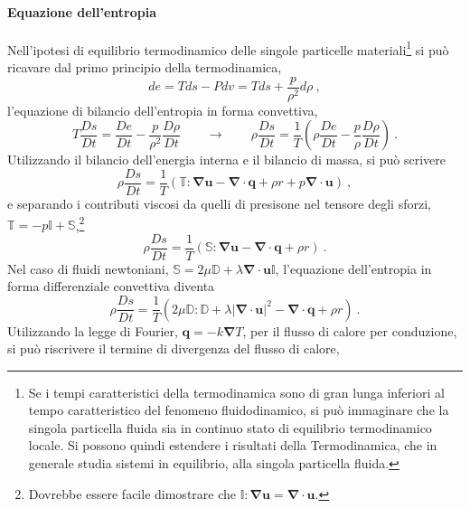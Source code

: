 \paragraph{Equazione dell'entropia} Nell'ipotesi di equilibrio termodinamico delle singole particelle materiali\footnote{Se i tempi caratteristici della termodinamica sono di gran lunga inferiori al tempo caratteristico del fenomeno fluidodinamico, si può immaginare che la singola particella fluida sia in continuo stato di equilibrio termodinamico locale. Si possono quindi estendere i risultati della Termodinamica, che in generale studia sistemi in equilibrio, alla singola particella fluida.} si può ricavare dal primo principio della termodinamica,
\begin{equation}
 de = T ds - P dv = T ds + \dfrac{p}{\rho^2} d\rho \ ,
\end{equation}
l'equazione di bilancio dell'entropia in forma convettiva,
\begin{equation}
 T \dfrac{D s}{D t} = \dfrac{D e}{D t} - \dfrac{p}{\rho^2} \dfrac{D \rho}{D t} \qquad \rightarrow \qquad
 \rho \dfrac{D s}{D t} = \dfrac{1}{T} \left( \rho \dfrac{D e}{D t} -  \dfrac{p}{\rho} \dfrac{D \rho}{D t} \right) \ . 
\end{equation}
Utilizzando il bilancio dell'energia interna e il bilancio di massa, si può scrivere
\begin{equation}
 \rho \dfrac{D s}{D t} = \dfrac{1}{T} \left( \mathbb{T} : \bm{\nabla} \bm{u} - \bm{\nabla} \cdot \bm{q} + \rho r + p \bm{\nabla} \cdot \bm{u} \right) \ ,
\end{equation}
e separando i contributi viscosi da quelli di presisone nel tensore degli sforzi, $\mathbb{T} = - p \mathbb{I} + \mathbb{S}$,\footnote{Dovrebbe essere facile dimostrare che $\mathbb{I}:\bm{\nabla}\bm{u} = \bm{\nabla} \cdot \bm{u}$.}
\begin{equation}
 \rho \dfrac{D s}{D t} = \dfrac{1}{T} \left( \mathbb{S} : \bm{\nabla} \bm{u} - \bm{\nabla} \cdot \bm{q} + \rho r \right) \ .
\end{equation}
Nel caso di fluidi newtoniani, $\mathbb{S} = 2\mu\mathbb{D} + \lambda\bm{\nabla} \cdot \bm{u} \mathbb{I}$, l'equazione dell'entropia in forma differenziale convettiva diventa
\begin{equation}
 \rho \dfrac{D s}{D t} = \dfrac{1}{T} \left( 2 \mu \mathbb{D} : \mathbb{D} + \lambda |\bm{\nabla} \cdot \bm{u}|^2 - \bm{\nabla} \cdot \bm{q} + \rho r \right) \ .
\end{equation}
Utilizzando la legge di Fourier, $\bm{q} = -k \bm{\nabla} T$, per il flusso di calore per conduzione, si può riscrivere il termine di divergenza del flusso di calore,

